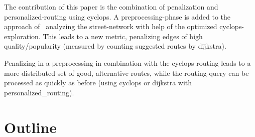     The contribution of this paper is the combination of penalization and personalized-routing using \gls{cyclops}.
    A preprocessing-phase is added to the approach of~\cite{barth:alternative_multicriteria_routes} analyzing the street-network with help of the optimized \gls{cyclops}-exploration.
    This leads to a new metric, penalizing edges of high quality/popularity (measured by counting suggested routes by \gls{dijkstra}).

    Penalizing in a preprocessing in combination with the \gls{cyclops}-routing leads to a more distributed set of good, alternative routes, while the routing-query can be processed as quickly as before (using \gls{cyclops} or \gls{dijkstra} with \gls{personalized_routing}).

\section{Outline}

